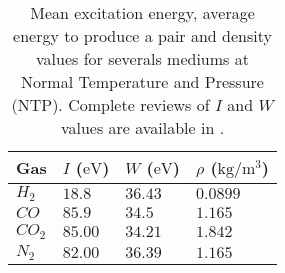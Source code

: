 \begin{table}[ht]
	\centering
	\caption[Mean excitation energy, average energy to produce a pair and density values for severals mediums at Normal Temperature and Pressure (NTP)]
	{Mean excitation energy, average energy to produce a pair and density values for severals mediums at Normal Temperature and Pressure (NTP). Complete reviews of \(I\) and \(W\) values are available in \cite{Kamakura2006}\cite{Bichsel1979}.}
	\label{chap3:WandI}
	\begin{tabularx}{\linewidth}{XXXX}
		\toprule
		Gas        & \(I\) (\(\mathrm{eV}\)) & \(W\) (\(\mathrm{eV}\)) & \(\rho\) (\(\mathrm{kg/m^{3}}\)) \\
		\midrule
		\(H_{2}\)  & \(18.8\)                & \(36.43\)               & \(0.0899\)                       \\
		\(CO\)     & \(85.9\)                & \(34.5\)                & \(1.165\)                        \\
		\(CO_{2}\) & \(85.00\)               & \(34.21\)               & \(1.842\)                        \\
		\(N_{2}\)  & \(82.00\)               & \(36.39\)               & \(1.165\)                        \\
		\bottomrule
	\end{tabularx}
\end{table}